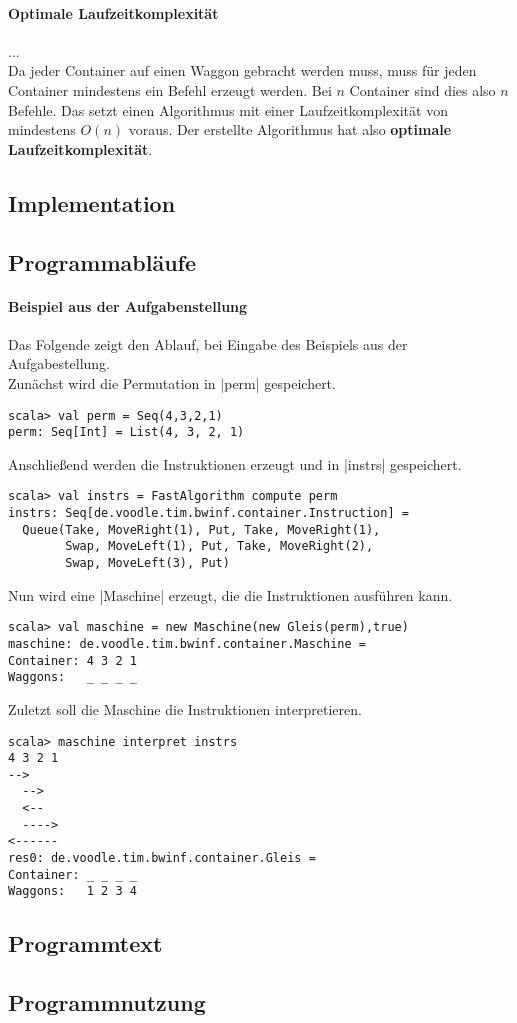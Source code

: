 \paragraph{Optimale Laufzeitkomplexität}
... \\
Da jeder Container auf einen Waggon gebracht werden muss, muss für jeden Container mindestens ein Befehl erzeugt werden.
Bei $n$ Container sind dies also $n$ Befehle. Das setzt einen Algorithmus mit einer Laufzeitkomplexität von mindestens $O(n)$ voraus.
Der erstellte Algorithmus hat also \textbf{optimale Laufzeitkomplexität}.

\subsection{Implementation}
\newpage
\subsection{Programmabläufe}
\paragraph{Beispiel aus der Aufgabenstellung}
Das Folgende zeigt den Ablauf, bei Eingabe des Beispiels aus der Aufgabestellung. \\
Zunächst wird die Permutation in |perm| gespeichert.
\begin{lstlisting}
scala> val perm = Seq(4,3,2,1)               
perm: Seq[Int] = List(4, 3, 2, 1)
\end{lstlisting}
Anschließend werden die Instruktionen erzeugt und in |instrs| gespeichert.
\begin{lstlisting}
scala> val instrs = FastAlgorithm compute perm
instrs: Seq[de.voodle.tim.bwinf.container.Instruction] =
  Queue(Take, MoveRight(1), Put, Take, MoveRight(1),
        Swap, MoveLeft(1), Put, Take, MoveRight(2),
        Swap, MoveLeft(3), Put)
\end{lstlisting}
Nun wird eine |Maschine| erzeugt, die die Instruktionen ausführen kann.
\begin{lstlisting}
scala> val maschine = new Maschine(new Gleis(perm),true)
maschine: de.voodle.tim.bwinf.container.Maschine = 
Container: 4 3 2 1
Waggons:   _ _ _ _
\end{lstlisting}
Zuletzt soll die Maschine die Instruktionen interpretieren.
\begin{lstlisting}
scala> maschine interpret instrs                        
4 3 2 1
-->
  -->
  <--
  ---->
<------
res0: de.voodle.tim.bwinf.container.Gleis = 
Container: _ _ _ _
Waggons:   1 2 3 4
\end{lstlisting}


\subsection{Programmtext}
\subsection{Programmnutzung}